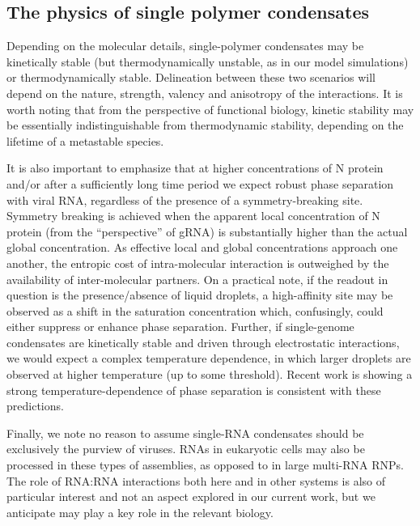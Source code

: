\documentclass[../main.tex]{subfiles}
\begin{document}
    \subsection{The physics of single polymer condensates}
        Depending on the molecular details, single-polymer condensates may be kinetically stable (but thermodynamically unstable, as in our model simulations) or thermodynamically stable. Delineation between these two scenarios will depend on the nature, strength, valency and anisotropy of the interactions. It is worth noting that from the perspective of functional biology, kinetic stability may be essentially indistinguishable from thermodynamic stability, depending on the lifetime of a metastable species. 

        It is also important to emphasize that at higher concentrations of N protein and/or after a sufficiently long time period we expect robust phase separation with viral RNA, regardless of the presence of a symmetry-breaking site. Symmetry breaking is achieved when the apparent local concentration of N protein (from the “perspective” of gRNA) is substantially higher than the actual global concentration. As effective local and global concentrations approach one another, the entropic cost of intra-molecular interaction is outweighed by the availability of inter-molecular partners. On a practical note, if the readout in question is the presence/absence of liquid droplets, a high-affinity site may be observed as a shift in the saturation concentration which, confusingly, could either suppress or enhance phase separation. Further, if single-genome condensates are kinetically stable and driven through electrostatic interactions, we would expect a complex temperature dependence, in which larger droplets are observed at higher temperature (up to some threshold). Recent work is showing a strong temperature-dependence of phase separation is consistent with these predictions\cite{Iserman2020-xm}.

        Finally, we note no reason to assume single-RNA condensates should be exclusively the purview of viruses. RNAs in eukaryotic cells may also be processed in these types of assemblies, as opposed to in large multi-RNA RNPs. The role of RNA:RNA interactions both here and in other systems is also of particular interest and not an aspect explored in our current work, but we anticipate may play a key role in the relevant biology.
\end{document}
